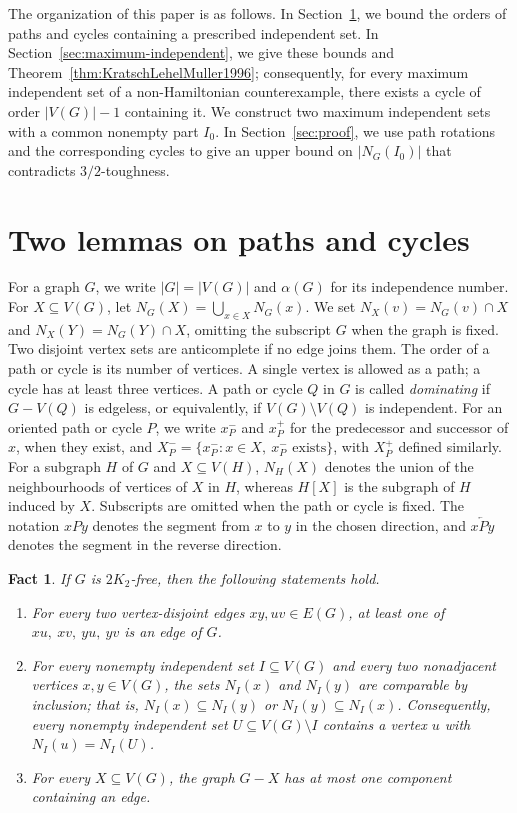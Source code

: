 \documentclass[11pt]{article}
\numberwithin{equation}{section}
\theoremstyle{plain}
\newtheorem{fact}[theorem]{Fact}
\theoremstyle{definition}
\theoremstyle{plain}
\begin{document}
The organization of this paper is as follows.
In Section~\ref{sec:preliminaries}, we bound the orders of paths and cycles
containing a prescribed independent set. In Section~\ref{sec:maximum-independent}, we give these bounds and Theorem~\ref{thm:KratschLehelMuller1996}; consequently, for every maximum independent set of a non-Hamiltonian counterexample, there exists a cycle of order 
$|V(G)|-1$ containing it. We construct two maximum
independent sets with a common nonempty part $I_0$.
In Section~\ref{sec:proof}, we use path rotations and the corresponding
cycles to give an upper bound on $|N_G(I_0)|$ that contradicts
$3/2$-toughness.

\section{Two lemmas on paths and cycles}\label{sec:preliminaries}

For a graph $G$, we write $|G|=|V(G)|$ and $\alpha(G)$ for its
independence number.
For $X\subseteq V(G)$, let $N_G(X)=\bigcup_{x\in X}N_G(x)$.
We   set $N_X(v)=N_G(v)\cap X$ and $N_X(Y)=N_G(Y)\cap X$,
omitting the subscript $G$ when the graph is fixed.
Two disjoint vertex sets are anticomplete if no edge joins them.
The order of a path or cycle is its number of vertices.
A single vertex is allowed as a path; a cycle has at least three
vertices. A path or cycle $Q$ in $G$ is called \emph{dominating} if
$G-V(Q)$ is edgeless, or equivalently, if
$V(G)\setminus V(Q)$ is independent.
For an oriented path or cycle $P$, we write $x_P^-$ and
$x_P^+$ for the predecessor and successor of $x$, when they exist,
and $X_P^-=\{x_P^-:x\in X,\ x_P^-\text{ exists}\}$, with
$X_P^+$ defined similarly. For a subgraph $H$ of $G$ and
$X\subseteq V(H)$, $N_H(X)$ denotes the union of the neighbourhoods
of vertices of $X$ in $H$, whereas $H[X]$ is the subgraph of $H$
induced by $X$.
Subscripts are omitted when the path or cycle is fixed.
The notation $xPy$ denotes the segment from $x$ to $y$ in the
chosen direction, and $x\overleftarrow{P}y$ denotes the segment
in the reverse direction.

\begin{fact}\label{fact:2K2-property}
   If $G$ is $2K_2$-free, then the following statements hold.
\begin{enumerate}[label=\textup{(\roman*)},nosep]
 \item For every two vertex-disjoint edges \(xy,uv\in E(G)\), at least one of
$xu,\ xv,\ yu,\ yv$ is an edge of \(G\).
    \item For every nonempty independent set $I\subseteq V(G)$ and every two
    nonadjacent vertices $x,y\in V(G)$, the sets $N_I(x)$ and $N_I(y)$
    are comparable by inclusion; that is,
        $N_I(x)\subseteq N_I(y)$ or
        $N_I(y)\subseteq N_I(x)$.
        Consequently, every nonempty independent set
$U\subseteq V(G)\setminus I$ contains a vertex $u$ with
$N_I(u)=N_I(U)$.
\item For every $X\subseteq V(G)$, the graph $G-X$ has at most one
    component containing an edge.
\end{enumerate}
\end{fact}
\end{document}
